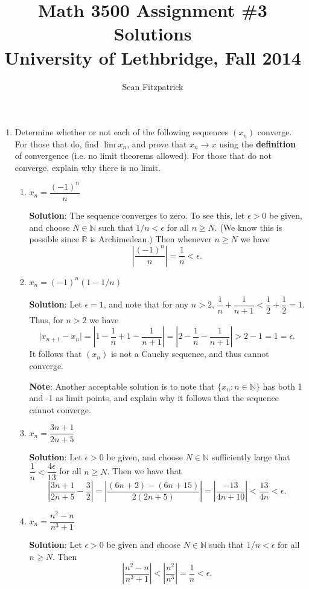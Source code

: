 \documentclass[letterpaper,12pt]{article}
\title{Math 3500 Assignment \#3 Solutions\\University of Lethbridge, Fall 2014}
\author{Sean Fitzpatrick}
\newcommand{\R}{\mathbb{R}}
\newcommand{\N}{\mathbb{N}}
\newcommand{\abs}[1]{\lvert #1\rvert}
\newcommand{\Abs}[1]{\left| #1\right|}
\begin{document}
 \maketitle


\begin{enumerate}
 \item Determine whether or not each of the following sequences $(x_n)$ converge. For those that do, find $\lim x_n$, and prove that $x_n\to x$ using the {\bf definition} of convergence (i.e. no limit theorems allowed). For those that do not converge, explain why there is no limit.
\begin{enumerate}
 \item $x_n = \dfrac{(-1)^n}{n}$
 
\bigskip

{\bf Solution}: The sequence converges to zero. To see this, let $\epsilon>0$ be given, and choose $N\in\N$ such that $1/n<\epsilon$ for all $n\geq N$. (We know this is possible since $\R$ is Archimedean.) Then whenever $n\geq N$ we have
\[
\Abs{\frac{(-1)^n}{n}} = \frac{1}{n}<\epsilon.
\]

 \item $x_n = (-1)^n(1-1/n)$
  
\bigskip

{\bf Solution}: Let $\epsilon=1$, and note that for any $n>2$, $\dfrac{1}{n}+\dfrac{1}{n+1}<\dfrac{1}{2}+\dfrac{1}{2}=1$. Thus, for $n>2$ we have
\[
\abs{x_{n+1}-x_n} = \Abs{1-\frac{1}{n}+1-\frac{1}{n+1}} = \Abs{2-\frac{1}{n}-\frac{1}{n+1}}>2-1=1=\epsilon.
\]
It follows that $(x_n)$ is not a Cauchy sequence, and thus cannot converge.

{\bf Note}: Another acceptable solution is to note that $\{x_n:n\in\N\}$ has both 1 and -1 as limit points, and explain why it follows that the sequence cannot converge.

 \item $x_n = \dfrac{3n+1}{2n+5}$
  
\bigskip

{\bf Solution}: Let $\epsilon>0$ be given, and choose $N\in \N$ sufficiently large that $\dfrac{1}{n}<\dfrac{4\epsilon}{13}$ for all $n\geq N$. Then we have that
\[
\Abs{\frac{3n+1}{2n+5}-\frac{3}{2}} = \Abs{\frac{(6n+2)-(6n+15)}{2(2n+5)}} = \Abs{\frac{-13}{4n+10}}<\frac{13}{4n}<\epsilon.
\]


 \item $x_n = \dfrac{n^2-n}{n^3+1}$
  
\bigskip

{\bf Solution}: Let $\epsilon>0$ be given and choose $N\in\N$ such that $1/n<\epsilon$ for all $n\geq N$. Then
\[
\Abs{\dfrac{n^2-n}{n^3+1}}<\Abs{\frac{n^2}{n^3}} = \frac{1}{n}<\epsilon.
\]


\end{enumerate}
\end{enumerate}
\end{document}
